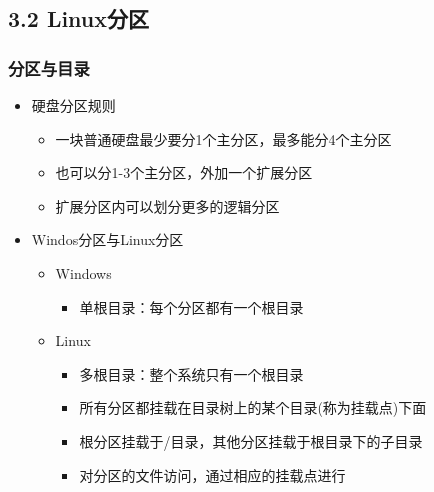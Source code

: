 \documentclass[xcolor=svgnames,presentation]{beamer}
\begin{document}
\subsection{3.2 Linux分区}
\label{sec-3-2}
\begin{frame}
\frametitle{分区与目录}
\label{sec-3-2-1}
\begin{itemize}

\item 硬盘分区规则
\label{sec-3-2-1-1}%
\begin{itemize}

\item 一块普通硬盘最少要分1个主分区，最多能分4个主分区
\label{sec-3-2-1-1-1}%

\item 也可以分1-3个主分区，外加一个扩展分区
\label{sec-3-2-1-1-2}%

\item 扩展分区内可以划分更多的逻辑分区
\label{sec-3-2-1-1-3}%
\end{itemize} %

\item Windos分区与Linux分区
\label{sec-3-2-1-2}%
\begin{itemize}

\item Windows
\label{sec-3-2-1-2-1}%
\begin{itemize}

\item 单根目录：每个分区都有一个根目录
\label{sec-3-2-1-2-1-1}%
\end{itemize} %

\item Linux
\label{sec-3-2-1-2-2}%
\begin{itemize}

\item 多根目录：整个系统只有一个根目录
\label{sec-3-2-1-2-2-1}%

\item 所有分区都挂载在目录树上的某个目录(称为挂载点)下面
\label{sec-3-2-1-2-2-2}%

\item 根分区挂载于/目录，其他分区挂载于根目录下的子目录
\label{sec-3-2-1-2-2-3}%

\item 对分区的文件访问，通过相应的挂载点进行
\label{sec-3-2-1-2-2-4}%
\end{itemize} %
\end{itemize} %
\end{itemize} %
\end{frame}
\end{document}
